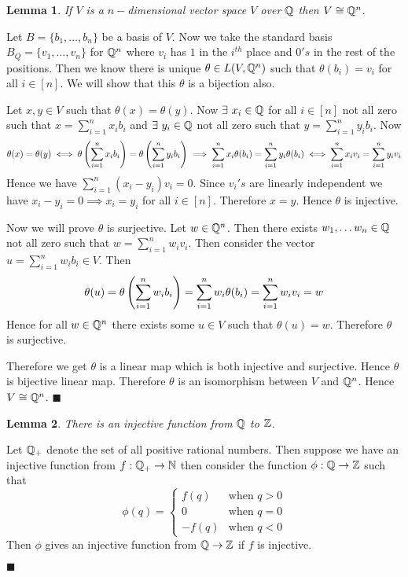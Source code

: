 \documentclass[a4paper, 11pt]{article}
\newtheorem{lemma}{Lemma}
\renewenvironment{proof}{\noindent{\it \textbf{Proof:}}\hspace*{1em}}{\hfill $\blacksquare$\bigskip\\}
\begin{document}
{\begin{itemize}
	\begin{lemma}\label{vtoqiso}
		If $V$ is  a $n-$dimensional vector space $V$ over $\mathbb{Q}$ then $V\cong \mathbb{Q}^n$.
	\end{lemma}
\begin{proof}
	Let $B=\{b_1,\dots,b_n\}$ be a basis of $V$. Now we take the standard basis  $B_Q=\{v_1,\dots,v_n\}$ for $\mathbb{Q}^n$ where $v_i$ has $1$ in the $i^{th}$ place and  $0's$ in the rest of the positions. Then we know there is unique $\theta\in L(V,\mathbb{Q}^n)$ such that $\theta(b_i)=v_i$ for all $i\in[n]$. We will show that this $\theta$ is a bijection also.
	
	 Let $x,y\in V$ such that $\theta(x)=\theta(y)$. Now $\exists\ x_i\in \mathbb{Q}$ for all $i\in[n]$ not all zero such that  $x=\sum\limits_{i=1}^nx_ib_i$ and $\exists \ y_i\in\mathbb{Q}$ not all zero such that $y=\sum\limits_{i=1}^ny_ib_i$. Now $$\theta(x)=\theta(y)\iff \theta\left(\sum\limits_{i=1}^nx_ib_i\right)=\theta\left(\sum\limits_{i=1}^ny_ib_i\right)\implies \sum\limits_{i=1}^nx_i\theta(b_i)=\sum\limits_{i=1}^ny_i\theta(b_i)\iff \sum\limits_{i=1}^nx_iv_i=\sum\limits_{i=1}^ny_iv_i$$Hence we have $\sum\limits_{i=1}^n (x_i-y_i)v_i=0$. Since $v_i's $ are linearly independent we have $x_i-y_i=0\implies x_i=y_i$ for all $i\in[n]$. Therefore $x=y$. Hence $\theta$ is injective.
	 
	 Now we will prove $\theta$ is surjective. Let $w\in \mathbb{Q}^n$. Then there exists $w_1,\dots w_n\in \mathbb{Q}$ not all zero such that $w=\sum\limits_{i=1}^n w_iv_i$. Then consider the vector $u=\sum\limits_{i=1}^nw_ib_i\in V$. Then $$\theta(u)=\theta\left(\sum\limits_{i=1}^nw_ib_i\right)=\sum_{i=1}^n w_i\theta(b_i)=\sum_{i=1}^nw_iv_i=w$$Hence for all $w\in \mathbb{Q}^n$ there exists some $u\in V$ such that $\theta(u)=w$. Therefore $\theta$ is surjective. 
	 
	 Therefore we get $\theta$ is a linear map which is both injective and surjective. Hence $\theta$ is bijective linear map. Therefore $\theta$ is an isomorphism between $V$ and $\mathbb{Q}^n$. Hence $V\cong \mathbb{Q}^n$.
\end{proof}

\begin{lemma}\label{qtozinj}
	There is an injective function from $\mathbb{Q}$ to $\mathbb{Z}$. 
\end{lemma}
\begin{proof}
	Let $\mathbb{Q}_+$ denote the set of all positive rational numbers. Then suppose we have an injective function from $f:\mathbb{Q}_+\to\mathbb{N}$ then consider the function $\phi:\mathbb{Q}\to \mathbb{Z}$ such that $$\phi(q)=\begin{cases}
		f(q) & \text{when $q>0$}\\
		0 & \text{when $q=0$}\\
		-f(q) & \text{when $q<0$}
	\end{cases}$$Then $\phi$ gives an injective function from $\mathbb{Q}\to \mathbb{Z}$ if $f$ is injective. 


\end{proof}
\end{itemize}}
\end{document}
